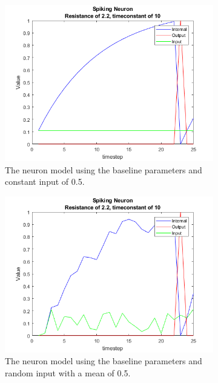 \begin{figure}
    \centering
    \begin{subfigure}[b]{0.3\textwidth}
        \includegraphics[width=\textwidth]{Images/slow.png}
        \caption{The neuron model using the baseline parameters and constant input of 0.5.}
        \label{fig:model1}
    \end{subfigure}
    \begin{subfigure}[b]{0.3\textwidth}
        \includegraphics[width=\textwidth]{Images/randomInput.png}
        \caption{The neuron model using the baseline parameters and random input with a mean of 0.5.}
        \label{fig:model2}
    \end{subfigure}
    \begin{subfigure}[b]{0.3\textwidth}

\end{subfigure}
\end{figure}
